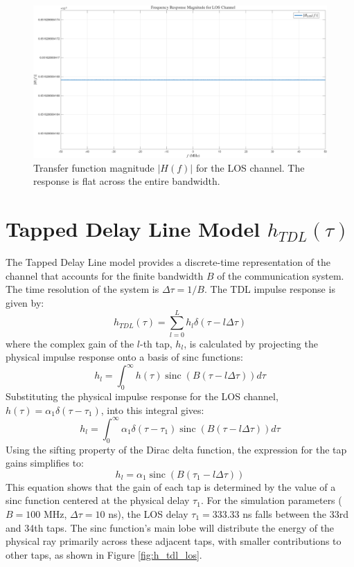\begin{figure}
	\includegraphics[width=\linewidth]{"content/4-images/Frequency Response H(f) - LOS.png"}
	\caption{Transfer function magnitude $|H(f)|$ for the LOS channel. The response is flat across the entire bandwidth.}
	\label{fig:Hf_los}
\end{figure}


\section{Tapped Delay Line Model $h_{TDL}(\tau)$}
The Tapped Delay Line model provides a discrete-time representation of the channel that accounts for the finite bandwidth $B$ of the communication system. The time resolution of the system is $\Delta\tau = 1/B$. The TDL impulse response is given by:
\begin{equation}
	h_{TDL}(\tau) = \sum_{l=0}^{L} h_l \delta(\tau - l\Delta\tau)
\end{equation}
where the complex gain of the $l$-th tap, $h_l$, is calculated by projecting the physical impulse response onto a basis of sinc functions:
\begin{equation}
	h_l = \int_0^{\infty} h(\tau) \operatorname{sinc}(B(\tau-l \Delta \tau)) d \tau
\end{equation}
Substituting the physical impulse response for the LOS channel, $h(\tau) = \alpha_1 \delta(\tau - \tau_1)$, into this integral gives:
\begin{equation}
	h_l = \int_0^{\infty} \alpha_1 \delta(\tau - \tau_1) \operatorname{sinc}(B(\tau-l \Delta \tau)) d \tau
\end{equation}
Using the sifting property of the Dirac delta function, the expression for the tap gains simplifies to:
\begin{equation}
	h_l = \alpha_1 \operatorname{sinc}(B(\tau_1 - l \Delta \tau))
\end{equation}
This equation shows that the gain of each tap is determined by the value of a sinc function centered at the physical delay $\tau_1$. For the simulation parameters ($B=100$ MHz, $\Delta\tau = 10$ ns), the LOS delay $\tau_1 = 333.33$ ns falls between the 33rd and 34th taps. The sinc function's main lobe will distribute the energy of the physical ray primarily across these adjacent taps, with smaller contributions to other taps, as shown in Figure \ref{fig:h_tdl_los}.

